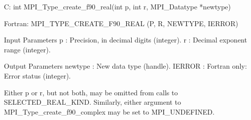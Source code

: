 C:
int MPI_Type_create_f90_real(int p, int r, MPI_Datatype *newtype)

Fortran:
MPI_TYPE_CREATE_F90_REAL (P, R, NEWTYPE, IERROR)

Input Parameters
p : Precision, in decimal digits (integer).
r : Decimal exponent range (integer).

Output Parameters
newtype : New data type (handle).
IERROR : Fortran only: Error status (integer).

Either p or r, but not both, may be omitted from calls to
SELECTED_REAL_KIND. Similarly, either argument to
MPI_Type_create_f90_complex may be set to MPI_UNDEFINED.
